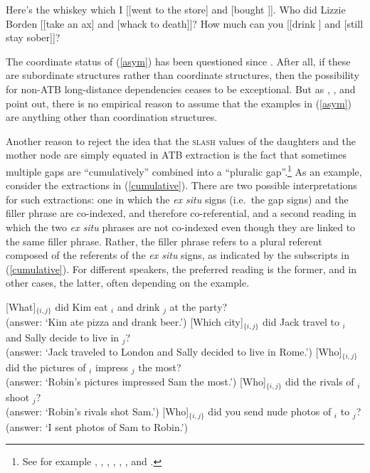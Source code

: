 \documentclass[output=paper,biblatex,babelshorthands,newtxmath,draftmode,colorlinks,citecolor=brown]{langscibook}
\begin{document}
\eal  \label{asym}
\ex
 Here's the whiskey  which I [[went to the store] and [bought \spc]].
\ex Who did Lizzie Borden [[take an ax] and [whack \spcs to death]]?
\ex How much can you [[drink \spc] and [still stay sober]]?
\zl


\noindent
The coordinate status of (\ref{asym}) has been questioned since . After all, if these
are subordinate structures rather than coordinate structures, then the possibility for non-ATB
long-distance dependencies ceases to be exceptional. But as \citet{schmerling72}, \citet{lakoff86},
\citet{levinepostal} and \citet[Chapter~5]{kehler} point out, there is no empirical reason to assume that the
examples in (\ref{asym}) are anything other than coordination structures.

Another reason to reject the idea that  the \textsc{slash} values of the daughters and the mother node
are simply equated in ATB extraction is the fact that sometimes multiple gaps are ``cumulatively''
combined into a ``pluralic gap''.\footnote{See for example  \citet{munn98atb,munn99atb},  \citet[136,
  160]{postal98}, \citet[125]{kehler}, \citet{gawronkehlersalt}, 
 \citet{zhang}, \citet{chavessubjexp}, and \citet{Vicente2016-NELS46}.}
As an example, consider the extractions in (\ref{cumulative}). There are two possible interpretations
for such extractions: one in which the \emph{ex situ} signs (i.e.\ the gap signs) and the filler
phrase are co-indexed, and therefore co-referential, and a second reading in which the two \emph{ex
  situ} phrases are not co-indexed even though they are linked to the same filler phrase.  Rather,
the filler phrase refers to a plural referent composed of the referents of the \emph{ex situ} signs,
as indicated by the subscripts in (\ref{cumulative}). For different speakers, the preferred reading
is the former, and in other cases, the latter, often depending on the example.

\eal \label{cumulative}
\ex
{}[What]$_{\lbrace i,j \rbrace}$ did Kim eat \trace$_i$ and drink \trace$_j$ at the party?\\
(answer: `Kim ate pizza and drank beer.')
\ex {}[Which city]$_{\lbrace i,j \rbrace}$ did Jack travel to \trace$_i$ and Sally decide to live in \trace$_j$?\\
(answer: `Jack traveled to London and Sally decided to live in Rome.')
\ex {}[Who]$_{\lbrace i,j \rbrace}$ did the pictures of \trace$_i$ impress \trace$_j$ the most?\\
(answer: `Robin's pictures impressed Sam the most.')
\ex {}[Who]$_{\lbrace i,j \rbrace}$ did the rivals of \trace$_i$ shoot \trace$_j$?\\
(answer: `Robin's rivals shot Sam.')
\ex {}[Who]$_{\lbrace i,j \rbrace}$ did you send nude photos of \trace$_i$ to \trace$_j$?\\
(answer: `I sent photos of Sam to Robin.')
\zl
\end{document}
